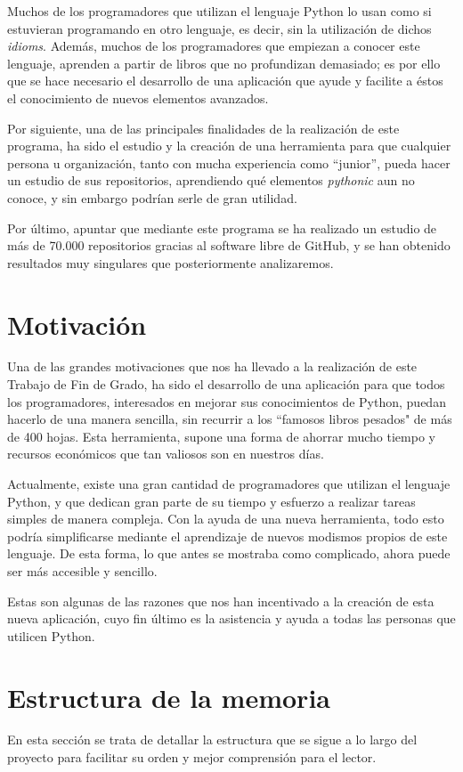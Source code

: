 \documentclass[a4paper, 12pt]{book}
\begin{document}
Muchos de los programadores que utilizan el lenguaje Python lo usan como si estuvieran programando en otro lenguaje, es decir, sin la utilización de dichos \textit{idioms}. Además, muchos de los programadores que empiezan a conocer este lenguaje, aprenden a partir de libros que no profundizan demasiado; es por ello que se hace necesario el desarrollo de una aplicación que ayude y facilite a éstos el conocimiento de nuevos elementos avanzados. 

Por siguiente, una de las principales finalidades de la realización de este programa, ha sido el estudio y la creación de una herramienta para que cualquier persona u organización, tanto con mucha experiencia como “junior”, pueda hacer un estudio de sus repositorios, aprendiendo qué elementos \textit{pythonic} aun no conoce, y sin embargo podrían serle de gran utilidad.

Por último, apuntar que mediante este programa se ha realizado un estudio de más de 70.000 repositorios gracias al software libre de GitHub, y se han obtenido resultados muy singulares que posteriormente analizaremos.



\section{Motivación}
Una de las grandes motivaciones que nos ha llevado a la realización de este Trabajo de Fin de Grado, ha sido el desarrollo de una aplicación para que todos los programadores, interesados en mejorar sus conocimientos de Python, puedan hacerlo de una manera sencilla, sin recurrir a los ``famosos libros pesados" de más de 400 hojas. Esta herramienta, supone una forma de ahorrar mucho tiempo y recursos económicos que tan valiosos son en nuestros días.

Actualmente, existe una gran cantidad de programadores que utilizan el lenguaje Python, y que dedican gran parte de su tiempo y esfuerzo a realizar tareas simples de manera compleja. Con la ayuda de una nueva herramienta, todo esto podría simplificarse mediante el aprendizaje de nuevos modismos propios de este lenguaje. De esta forma, lo que antes se mostraba como complicado, ahora puede ser más accesible y sencillo.

Estas son algunas de las razones que nos han incentivado a la creación de esta nueva aplicación, cuyo fin último es la asistencia y ayuda a todas las personas que utilicen Python.

\section{Estructura de la memoria}
En esta sección se trata de detallar la estructura que se sigue a lo largo del proyecto para facilitar su orden y mejor comprensión para el lector.
\end{document}

